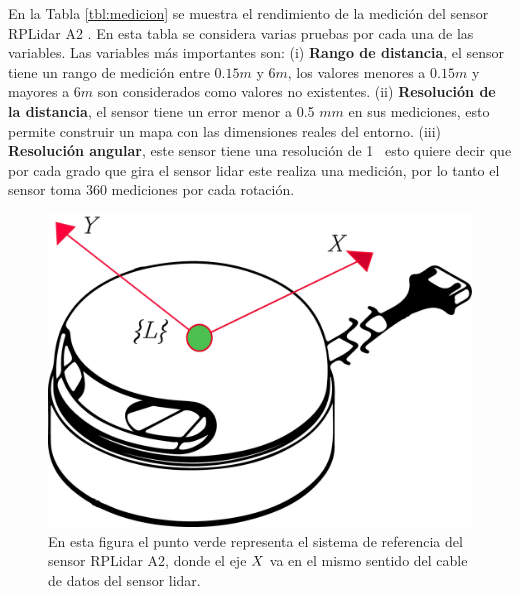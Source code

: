 En la Tabla \ref{tbl:medicion} se muestra el rendimiento de la medición del 
sensor RPLidar A2 \cite{Slamtec}. En esta tabla se considera varias pruebas 
por cada una de las variables. Las variables más importantes son: (i) 
\textbf{Rango de distancia}, el sensor tiene un rango de medición entre $0.15 
m$ y $6 m$, los valores menores a $0.15 m$ y mayores a $6 m$ son 
considerados como valores no existentes. (ii) \textbf{Resolución de la 
distancia}, el sensor tiene un error menor a 0.5 $mm$ en sus mediciones, esto 
permite construir un mapa con las dimensiones reales del entorno. (iii) 
\textbf{Resolución angular}, este sensor tiene una resolución de 1\grad~ esto 
quiere decir que por cada grado que gira el sensor lidar este realiza una medición, 
por lo tanto el sensor toma 360 mediciones por cada rotación.

\begin{figure}
	\centering \footnotesize
	\includegraphics[width=0.40\linewidth]{images/frame_laser.png}
	\captionsetup{font=footnotesize}
	\caption{En esta figura el punto verde representa el sistema de referencia 
	del sensor RPLidar A2, donde el eje $\mathnormal X$ va en el mismo sentido del cable 
	de datos del sensor lidar.}
	\label{fig:FrameLidar}
\end{figure}

